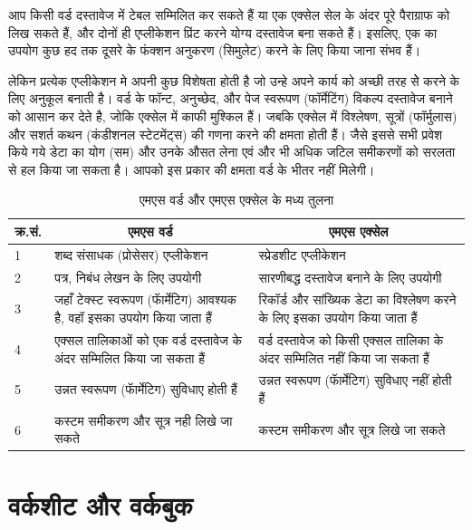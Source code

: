 आप किसी वर्ड दस्तावेज में टेबल सम्मिलित कर सकते हैं या एक एक्सेल सेल के अंदर पूरे पैराग्राफ को लिख सकते हैं, और दोनों ही एप्लीकेशन प्रिंट करने योग्य दस्तावेज बना सकते हैं। इसलिए, एक का उपयोग कुछ हद तक दूसरे के फंक्शन अनुकरण (सिमुलेट) करने के लिए किया जाना संभव हैं।

लेकिन प्रत्येक एप्लीकेशन मे अपनी कुछ विशेषता होती है जो उन्हे अपने कार्य को अच्छी तरह सेे करने के लिए अनुकूल बनाती है। वर्ड के फॉन्ट, अनुच्छेद, और पेज स्वरूपण (फॉर्मेटिंग) विकल्प दस्तावेज बनाने को आसान कर देते है, जोकि एक्सेल में काफी मुश्किल हैं। जबकि एक्सेल में विश्लेषण, सूत्रों (फॉर्मुलास) और सशर्त कथन (कंडीशनल स्टेटमेंट्स) की गणना करने की क्षमता होती हैं। जैसे इससे सभी प्रवेश किये गये डेटा का योग (सम) और उनके औसत लेना एवं और भी अधिक जटिल समीकरणों को सरलता से हल किया जा सकता है। आपको इस प्रकार की क्षमता वर्ड के भीतर नहीं मिलेगी।

\begin{table}[h]
\centering
\caption{एमएस वर्ड और एमएस एक्सेल के मध्य तुलना}
\begin{tabular}{@{}|l|p{6cm}|p{6cm}@{}|}
\hline
\multicolumn{1}{|c}{\textbf{क्र.सं.}} & \multicolumn{1}{|c|}{\textbf{एमएस वर्ड}} & \multicolumn{1}{c|}{\textbf{एमएस एक्सेल}} \\
\hline
1 & शब्द संसाधक (प्रोसेसर) एप्लीकेशन & स्प्रेडशीट एप्लीकेशन \\
\hline
2 & पत्र, निबंध लेखन के लिए उपयोगी & सारणीबद्ध दस्तावेज बनाने के लिए उपयोगी \\
\hline
3 & जहाँ टेक्स्ट स्वरूपण (फॅार्मेटिग) आवश्यक है, वहॉ इसका उपयोग किया जाता हैं & रिकॉर्ड और सांख्यिक डेटा का विश्लेषण करने के लिए इसका उपयोग किया जाता हैं \\
\hline
4 & एक्सल तालिकाओं को एक वर्ड दस्तावेज के अंदर सम्मिलित किया जा सकता हैं & वर्ड दस्तावेज को किसी एक्सल तालिका के अंदर सम्मिलित नहीं किया जा सकता हैं \\
\hline
5 & उन्नत स्वरूपण (फॅार्मेटिग) सुविधाए होती हैं & उन्नत स्वरूपण (फॅार्मेटिग) सुविधाए नहीं होती हैं \\
\hline
6 & कस्टम समीकरण और सूत्र नही लिखे जा सकते & कस्टम समीकरण और सूत्र लिखे जा सकते \\
\hline
\end{tabular}
\end{table}


\section{वर्कशीट और वर्कबुक}\label{id-1.2}

